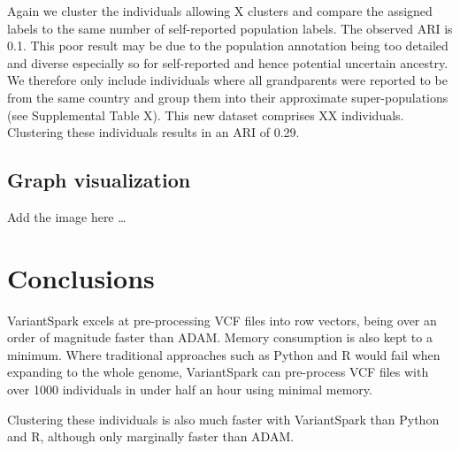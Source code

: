 \documentclass{bmcart}
\newcommand{\variantSpark}{{\sc VariantSpark}}
\begin{document}
Again we cluster the individuals allowing X clusters and compare the assigned labels to the same number of self-reported population labels.
The observed ARI is 0.1. 
This poor result may be due to the population annotation being too detailed and diverse especially so for self-reported and hence potential uncertain ancestry.
We therefore only include individuals where all grandparents were reported to be from the same country and group them into their approximate super-populations (see Supplemental Table X). 
This new dataset comprises XX individuals.
Clustering these individuals results in an ARI of 0.29. 


\subsection*{Graph visualization}
Add the image here \ldots




\section*{Conclusions}
\variantSpark{} excels at pre-processing VCF files into row vectors, being over an order of magnitude faster than ADAM. Memory consumption is also kept to a minimum. Where traditional approaches such as Python and R would fail when expanding to the whole genome,
\variantSpark{} can pre-process VCF files with over 1000 individuals in under half an hour using minimal memory.

Clustering these individuals is also much faster with \variantSpark{} than Python and R, although only marginally faster than ADAM.
\end{document}
